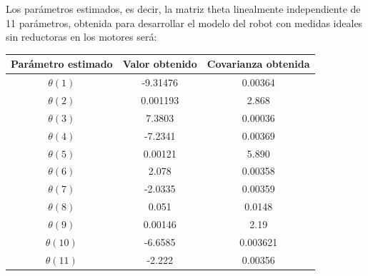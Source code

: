 Los parámetros estimados, es decir, la matriz theta linealmente independiente de 11 parámetros, obtenida para desarrollar el modelo del robot con medidas ideales sin reductoras en los motores será:

\begin{center}
	
	\begin{tabular}{| c | c | c |}
		
		
		
		\hline
		
		Parámetro estimado & Valor obtenido & Covarianza obtenida \\
		
		\hline
		
		$\theta(1) $ & -9.31476 & 0.00364 \\
		
		\hline
		
		$\theta(2) $ & 0.001193 & 2.868 \\
		
		\hline
		
		$\theta(3) $ & 7.3803 & 0.00036 \\
		
		\hline
		
		$\theta(4) $ & -7.2341 & 0.00369 \\
		
		\hline
		
		$\theta(5) $ & 0.00121 & 5.890 \\
		
		\hline
		
		$\theta(6) $ & 2.078 & 0.00358 \\
		
		\hline
		
		$\theta(7) $ & -2.0335 & 0.00359 \\
		
		\hline
		
		$\theta(8) $ & 0.051 & 0.0148 \\
		
		\hline
		
		$\theta(9) $ & 0.00146 & 2.19 \\
		
		\hline
		
		$\theta(10) $ & -6.6585 & 0.003621 \\
		
		\hline
		
		$\theta(11) $ & -2.222 & 0.00356 \\
		
		\hline
		
	\end{tabular}
	
\end{center}

